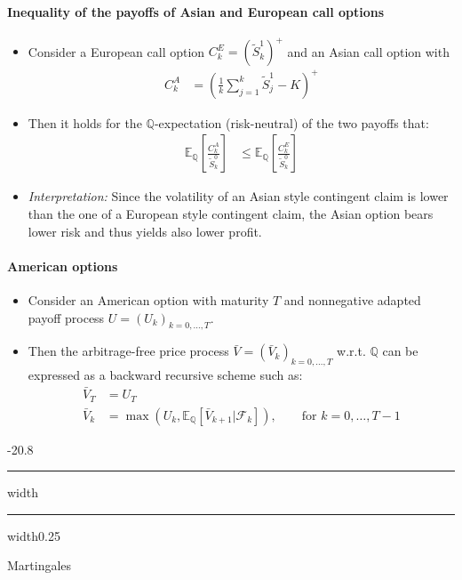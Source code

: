 \documentclass[a4paper,landscape,8pt,fleqn]{scrartcl}
\makeatletter
\renewcommand{\section}{\@startsection{section}{1}{0mm}%
{-2\baselineskip}{0.8\baselineskip}%
{\hrule depth 0.2pt width\columnwidth\hrule depth1.5pt
width0.25\columnwidth\vspace*{1.2em}\Large\bfseries}}
\makeatother
\begin{document}
\begin{multicols*}{3}
\paragraph{Inequality of the payoffs of Asian and European call options}

\begin{itemize}
\item Consider a European call option $C_k^E = (\tilde S_k^1)^+$ and an Asian call option with
\begin{align*}
C_k^A &= \left( \frac{1}{k} \sum_{j=1}^k \tilde S_j^1 - K \right)^+
\end{align*}
\item Then it holds for the $\mathbb{Q}$-expectation (risk-neutral) of the two payoffs that:
\begin{align*}
\mathbb{E}_\mathbb{Q}\left[ \frac{C_k^A}{\tilde S_k^0} \right] &\leq \mathbb{E}_\mathbb{Q} \left[ \frac{C_k^E}{\tilde S_k^0} \right]
\end{align*}
\item \textit{Interpretation:} Since the volatility of an Asian style contingent claim is lower than the one of a European style contingent claim, the Asian option bears lower risk and thus yields also lower profit.
\end{itemize}

\paragraph{American options}

\begin{itemize}
\item Consider an American option with maturity $T$ and nonnegative adapted payoff process $U = (U_k)_{k=0,\ldots,T}$.
\item Then the arbitrage-free price process $\bar V = (\bar V_k)_{k=0,\ldots,T}$ w.r.t. $\mathbb{Q}$ can be expressed as a backward recursive scheme such as:
\begin{align*}
\bar V_T &= U_T \\
\bar V_k &= \max(U_k,\mathbb{E}_\mathbb{Q}[\bar V_{k+1}|\mathcal{F}_k]), \qquad \text{for } k=0,\ldots, T-1
\end{align*}
\end{itemize}

\columnbreak

\section{Martingales}


\end{multicols*}
\end{document}
